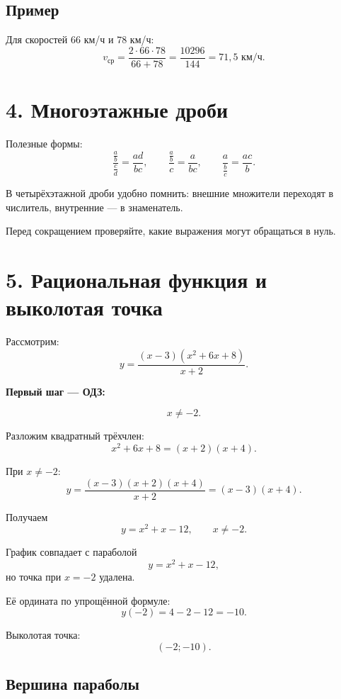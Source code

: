 \documentclass[a4paper,12pt]{article}
\newcommand{\important}[1]{%
    {\color{warning}\bfseries #1}
}
\begin{document}
\subsection*{Пример}

Для скоростей \(66\) км/ч и \(78\) км/ч:
\[
v_{\text{ср}}
=
\frac{2\cdot66\cdot78}{66+78}
=
\frac{10296}{144}
=
\boxed{71{,}5\text{ км/ч}}.
\]


\section*{\color{darkaccent}4. Многоэтажные дроби}

Полезные формы:
\[
\boxed{
\frac{\frac ab}{\frac cd}
=
\frac{ad}{bc}
},
\qquad
\boxed{
\frac{\frac ab}{c}
=
\frac{a}{bc}
},
\qquad
\boxed{
\frac{a}{\frac bc}
=
\frac{ac}{b}
}.
\]

В четырёхэтажной дроби удобно помнить:
внешние множители переходят в числитель,
внутренние --- в знаменатель.

Перед сокращением проверяйте, какие выражения могут обращаться в нуль.


\section*{\color{darkaccent}
5. Рациональная функция и выколотая точка
}

Рассмотрим:
\[
y=
\frac{(x-3)(x^2+6x+8)}{x+2}.
\]

\important{Первый шаг --- ОДЗ:}
\[
x\ne-2.
\]

Разложим квадратный трёхчлен:
\[
x^2+6x+8=(x+2)(x+4).
\]

При \(x\ne-2\):
\[
y=
\frac{(x-3)(x+2)(x+4)}{x+2}
=
(x-3)(x+4).
\]

Получаем
\[
y=x^2+x-12,
\qquad
x\ne-2.
\]

График совпадает с параболой
\[
y=x^2+x-12,
\]
но точка при \(x=-2\) удалена.

Её ордината по упрощённой формуле:
\[
y(-2)=4-2-12=-10.
\]

Выколотая точка:
\[
\boxed{(-2;-10)}.
\]

\subsection*{Вершина параболы}
\end{document}
